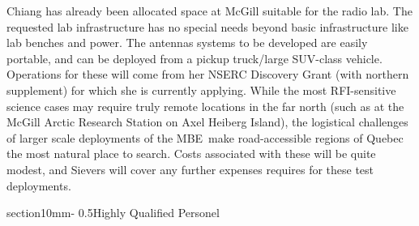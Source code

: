 \documentclass[letterpaper,11pt,preprint]{aastex}
\makeatletter
\newcommand{\mbe}{{\rm MBE}}
\renewcommand{\section}{\@startsection%
{section}{1}{0mm}{-\baselineskip}%
{0.5\baselineskip}{\normalfont\Large\bfseries}}%
\makeatother
\begin{document}
Chiang has already been allocated space at McGill suitable for the
radio lab.  The requested lab infrastructure has no special needs
beyond basic infrastructure like lab benches and power.  The antennas
systems to be developed are easily portable, and can be deployed from
a pickup truck/large SUV-class vehicle.  Operations for these will
come from her NSERC Discovery Grant (with northern supplement) for
which she is currently applying.  While the most RFI-sensitive
science cases may require truly remote locations in the far north
(such as at the McGill Arctic Research Station on Axel Heiberg
Island), the logistical challenges of larger scale deployments of the
\mbe\ make road-accessible regions of Quebec the most natural place to
search.  Costs associated with these will be quite modest, and Sievers
will cover any further expenses requires for these test deployments.

\section{Highly Qualified Personel}
\end{document}
